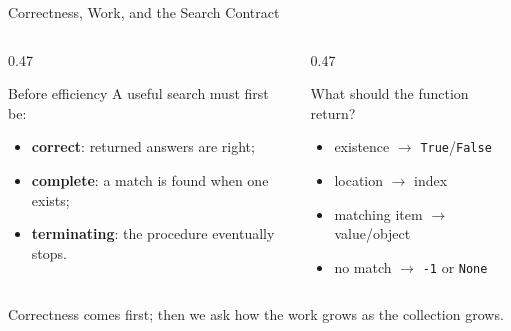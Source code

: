 \documentclass[aspectratio=169,10pt]{beamer}
\begin{document}
\begin{frame}{Correctness, Work, and the Search Contract}
  \begin{columns}[T,onlytextwidth]
    \begin{column}{0.47\textwidth}
      \begin{block}{Before efficiency}
        A useful search must first be:
        \begin{itemize}
          \item \textbf{correct}: returned answers are right;
          \item \textbf{complete}: a match is found when one exists;
          \item \textbf{terminating}: the procedure eventually stops.
        \end{itemize}
      \end{block}
    \end{column}
    \begin{column}{0.47\textwidth}
      \begin{block}{What should the function return?}
        \begin{itemize}
          \item existence $\rightarrow$ \texttt{True}/\texttt{False}
          \item location $\rightarrow$ index
          \item matching item $\rightarrow$ value/object
          \item no match $\rightarrow$ \texttt{-1} or \texttt{None}
        \end{itemize}
      \end{block}
    \end{column}
  \end{columns}

  \begin{keyidea}
    Correctness comes first; then we ask how the work grows as the collection grows.
  \end{keyidea}
\end{frame}

\end{document}
